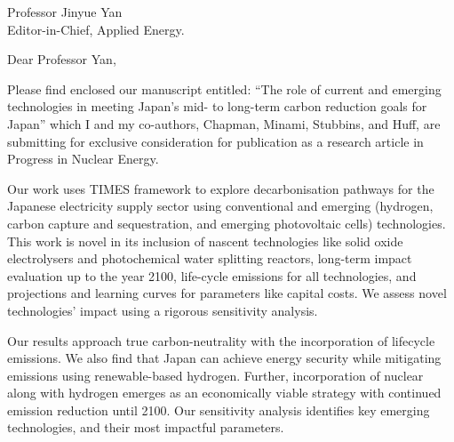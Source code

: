 \documentclass[10pt]{letter} %
\begin{document}
{}


\begin{letter}{Professor Jinyue Yan\\
Editor-in-Chief, Applied Energy.}


\address{Anshuman Chaube\\
achaube2@illinois.edu\\
226 Talbot Laboratory\\
MC-234\\
104 S. Wright Street\\
Urbana, IL 61801}



\opening{Dear Professor Yan,}

Please find enclosed our manuscript entitled: ``The role of current and emerging technologies in meeting Japan's mid- to long-term carbon reduction goals for Japan'' which I and my co-authors, Chapman, Minami, Stubbins, and Huff, 
are submitting for exclusive consideration for publication as a research 
article in Progress in Nuclear Energy.

Our work uses TIMES framework to explore decarbonisation pathways for the Japanese electricity supply sector using conventional and emerging (hydrogen, carbon capture and sequestration, and emerging photovoltaic cells) technologies. This work is novel in its inclusion of nascent technologies like solid oxide electrolysers and photochemical water splitting reactors, long-term impact evaluation up to the year 2100, life-cycle emissions for all technologies, and projections and learning curves for parameters like capital costs. We assess novel technologies’ impact using a rigorous sensitivity analysis.

Our results approach true carbon-neutrality with the incorporation of lifecycle emissions. We also find that Japan can achieve energy security while mitigating emissions using renewable-based hydrogen. Further, incorporation of nuclear along with hydrogen emerges as an economically viable strategy with continued emission reduction until 2100. Our sensitivity analysis identifies key emerging technologies, and their most impactful parameters. 


\end{letter}
\end{document}
